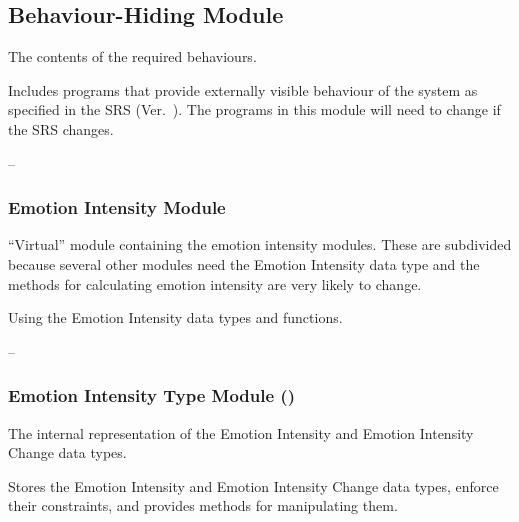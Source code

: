 \subsection{Behaviour-Hiding Module}

\begin{description}[font=\scshape]
    \item[Secrets:]The contents of the required behaviours.

    \item[Services:] Includes programs that provide externally visible behaviour
    of the system as specified in the SRS (Ver.~\srsVersion). The programs in
    this module will need to change if the SRS changes.

    \item[Implemented By:] --
\end{description}

\subsubsection{Emotion Intensity Module}

\begin{description}[font=\scshape]
    \item[Secrets:] ``Virtual'' module containing the emotion intensity
    modules. These are subdivided because several other modules need the
    Emotion Intensity data type and the methods for calculating emotion
    intensity are very likely to change.

    \item[Services:] Using the Emotion Intensity data types and functions.

    \item[Implemented By:] --
\end{description}

\subsubsection{Emotion Intensity Type Module ()}

\begin{description}[font=\scshape]
    \item[Secrets:] The internal representation of the Emotion Intensity and
    Emotion Intensity Change data types.

    \item[Services:] Stores the Emotion Intensity and Emotion Intensity Change
    data types, enforce their constraints, and provides methods for
    manipulating them.

    \item[Implemented By:] \progname{}
\end{description}

